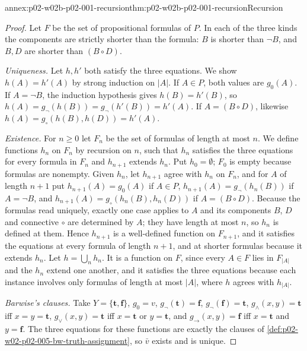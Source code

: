 \begin{annexitem}{annex:p02-w02b-p02-001-recursion}{thm:p02-w02b-p02-001-recursion}{Recursion}
\begin{proof}
Let \(F\) be the set of propositional formulas of \(P\).  In each of the
three kinds the components are strictly shorter than the formula: \(B\) is
shorter than \(\neg B\), and \(B,D\) are shorter than \((B\circ D)\).

\emph{Uniqueness.}  Let \(h,h'\) both satisfy the three equations.  We show
\(h(A)=h'(A)\) by strong induction on \(|A|\).  If \(A\in P\), both values
are \(g_0(A)\).  If \(A=\neg B\), the induction hypothesis gives
\(h(B)=h'(B)\), so \(h(A)=g_\neg(h(B))=g_\neg(h'(B))=h'(A)\).  If
\(A=(B\circ D)\), likewise \(h(A)=g_\circ(h(B),h(D))=h'(A)\).

\emph{Existence.}  For \(n\geq0\) let \(F_n\) be the set of formulas of
length at most \(n\).  We define functions \(h_n\) on \(F_n\) by recursion
on \(n\), such that \(h_n\) satisfies the three equations for every
formula in \(F_n\) and \(h_{n+1}\) extends \(h_n\).  Put \(h_0=\emptyset\);
\(F_0\) is empty because formulas are nonempty.  Given \(h_n\), let
\(h_{n+1}\) agree with \(h_n\) on \(F_n\), and for \(A\) of length \(n+1\)
put \(h_{n+1}(A)=g_0(A)\) if \(A\in P\), \(h_{n+1}(A)=g_\neg(h_n(B))\) if
\(A=\neg B\), and \(h_{n+1}(A)=g_\circ(h_n(B),h_n(D))\) if
\(A=(B\circ D)\).  Because the formulas read uniquely, exactly one case
applies to \(A\) and its components \(B\), \(D\) and connective \(\circ\)
are determined by \(A\); they have length at most \(n\), so \(h_n\) is
defined at them.  Hence \(h_{n+1}\) is a well-defined function on
\(F_{n+1}\), and it satisfies the equations at every formula of length
\(n+1\), and at shorter formulas because it extends \(h_n\).  Let
\(h=\bigcup_n h_n\).  It is a function on \(F\), since every \(A\in F\) lies
in \(F_{|A|}\) and the \(h_n\) extend one another, and it satisfies the
three equations because each instance involves only formulas of length at
most \(|A|\), where \(h\) agrees with \(h_{|A|}\).

\emph{Barwise's clauses.}  Take \(Y=\{\mathbf t,\mathbf f\}\), \(g_0=v\),
\(g_\neg(\mathbf t)=\mathbf f\), \(g_\neg(\mathbf f)=\mathbf t\),
\(g_\land(x,y)=\mathbf t\) iff \(x=y=\mathbf t\),
\(g_\lor(x,y)=\mathbf t\) iff \(x=\mathbf t\) or \(y=\mathbf t\), and
\(g_\to(x,y)=\mathbf f\) iff \(x=\mathbf t\) and \(y=\mathbf f\).  The three
equations for these functions are exactly the clauses of
\cref{def:p02-w02-p02-005-bw-truth-assignment}, so \(\bar v\) exists and is
unique.
\end{proof}
\end{annexitem}

